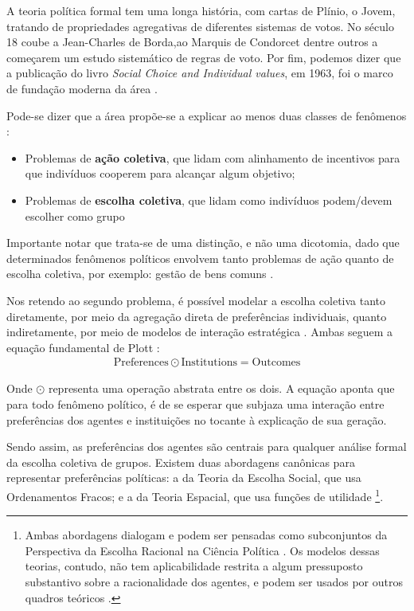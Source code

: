 A teoria política formal tem uma longa história, com cartas de Plínio, o Jovem,
tratando de propriedades agregativas de diferentes sistemas de votos. No século
18 coube a Jean-Charles de Borda,ao Marquis de Condorcet dentre outros a
começarem um estudo sistemático de regras de voto. Por fim, podemos dizer que a
publicação do livro \textit{Social Choice and Individual values}, em 1963, foi o
marco de fundação moderna da área \cite{mclean1995classics,arrow1963social}.

Pode-se dizer que a área propõe-se a explicar ao menos duas classes de fenômenos
\cite{elster2015explaining}:
\begin{itemize}
\item Problemas de \textbf{ação coletiva}, que lidam com alinhamento de
  incentivos para que indivíduos cooperem para alcançar algum objetivo;
\item Problemas de \textbf{escolha coletiva}, que lidam como indivíduos
  podem/devem escolher como grupo
\end{itemize}

Importante notar que trata-se de uma distinção, e não uma dicotomia, dado que
determinados fenômenos políticos envolvem tanto problemas de ação quanto de
escolha coletiva, por exemplo: gestão de bens comuns
\cite{putnam2002collapse,ostrom2015governing}.

Nos retendo ao segundo problema, é possível modelar a escolha coletiva tanto
diretamente, por meio da agregação direta de preferências individuais, quanto
indiretamente, por meio de modelos de interação estratégica
\cite{austen1998social}. Ambas seguem a equação fundamental
de Plott \cite{plott1991will}:
\begin{align*}
  \text{Preferences} \odot \text{Institutions} = \text{Outcomes}
\end{align*}

Onde $\odot$ representa uma operação abstrata entre os dois. A equação aponta que
para todo fenômeno político, é de se esperar que subjaza uma interação entre
preferências dos agentes e instituições no tocante à explicação de sua geração.

Sendo assim, as preferências dos agentes são centrais para qualquer análise
formal da escolha coletiva de grupos. Existem duas abordagens canônicas para
representar preferências políticas: a da Teoria da Escolha Social, que usa
Ordenamentos Fracos; e a da Teoria Espacial, que usa funções de utilidade
\cite{munger2015choosing} \footnote{Ambas abordagens dialogam e podem ser
  pensadas como subconjuntos da Perspectiva da Escolha Racional na Ciência
  Política \cite{munger2015choosing}. Os modelos dessas teorias, contudo, não
  tem aplicabilidade restrita a algum pressuposto substantivo sobre a
  racionalidade dos agentes, e podem ser usados por outros quadros teóricos
  \cite{poole2008scaling}.}.

